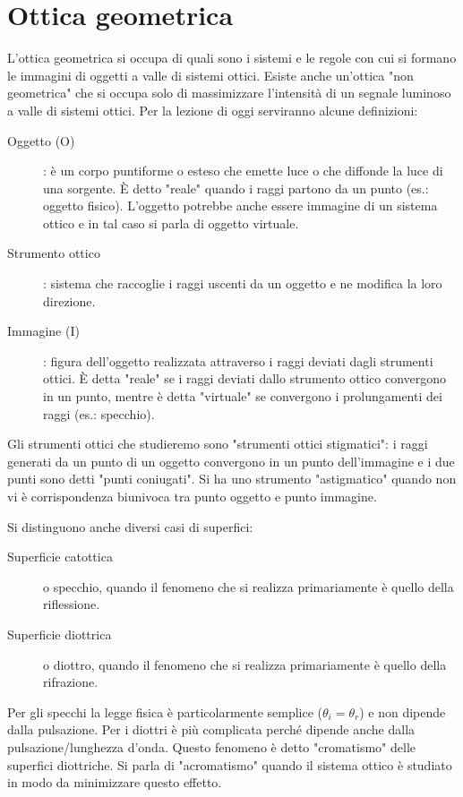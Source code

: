 \chapter{Ottica geometrica}
L'ottica geometrica si occupa di quali sono i sistemi e le regole con cui si formano le immagini di oggetti a valle di sistemi ottici. Esiste anche un'ottica "non geometrica" che si occupa solo di massimizzare l'intensità di un segnale luminoso a valle di sistemi ottici. Per la lezione di oggi serviranno alcune definizioni:
\begin{description}
	\item[Oggetto (O)]: è un corpo puntiforme o esteso che emette luce o che diffonde la luce di una sorgente. È detto "reale" quando i raggi partono da un punto (es.: oggetto fisico). L'oggetto potrebbe anche essere immagine di un sistema ottico e in tal caso si parla di oggetto virtuale.
	\item[Strumento ottico]: sistema che raccoglie i raggi uscenti da un oggetto e ne modifica la loro direzione.
	\item[Immagine (I)]: figura dell'oggetto realizzata attraverso i raggi deviati dagli strumenti ottici. È detta "reale" se i raggi deviati dallo strumento ottico convergono in un punto, mentre è detta "virtuale" se convergono i prolungamenti dei raggi (es.: specchio).
\end{description}
Gli strumenti ottici che studieremo sono "strumenti ottici stigmatici": i raggi generati da un punto di un oggetto convergono in un punto dell'immagine e i due punti sono detti "punti coniugati". Si ha uno strumento "astigmatico" quando non vi è corrispondenza biunivoca tra punto oggetto e punto immagine.

Si distinguono anche diversi casi di superfici:
\begin{description}
	\item[Superficie catottica] o specchio, quando il fenomeno che si realizza primariamente è quello della riflessione.
	\item[Superficie diottrica] o diottro, quando il fenomeno che si realizza primariamente è quello della rifrazione.
\end{description}
Per gli specchi la legge fisica è particolarmente semplice (\(\theta _i = \theta _r\)) e non dipende dalla pulsazione. Per i diottri è più complicata perché dipende anche dalla pulsazione/lunghezza d'onda. Questo fenomeno è detto "cromatismo" delle superfici diottriche. Si parla di "acromatismo" quando il sistema ottico è studiato in modo da minimizzare questo effetto.

